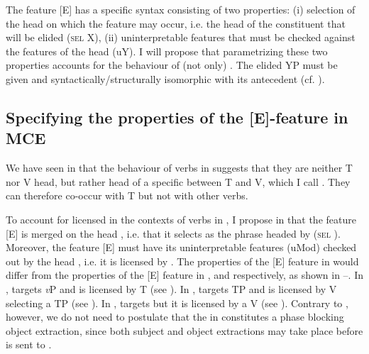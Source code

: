 \documentclass[output=paper,colorlinks,citecolor=brown,]{langsci/langscibook}
\begin{document}
The feature [E] has a specific syntax consisting of two properties:
(i) selection of the head on which the feature may occur, i.e. the head of the constituent that will be elided (\textsc{sel} X), (ii) uninterpretable features that must be checked against the features of the head  (uY). I will propose that parametrizing these two properties accounts for the behaviour of (not only)  . The elided YP must be given \citep{Barbiers1995,Lobeck1995,Merchant2001} and syntactically/structurally isomorphic with its antecedent (cf. \citealt{fiengo1994indices}).

\subsection{Specifying the properties of the [E]-feature in MCE} \label{sec:5.1}

We have seen in  that the behaviour of  verbs in  suggests that they are neither T nor V head, but rather head of a specific  between T and V, which I call . They can therefore co-occur with T but not with other  verbs.

To account for  licensed in the contexts of  verbs in , I propose in  that the feature [E] is merged on the head , i.e. that it selects as  the phrase headed by  (\textsc{sel} ). Moreover, the feature [E] must have its uninterpretable features (uMod) checked out by the head , i.e. it is licensed by . The properties of the [E] feature in  would differ from the properties of the [E] feature in ,  and  respectively, as shown in --. In ,  targets \textit{v}P and is licensed by T (see \citealt{Merchant2008a}). In ,  targets TP and is licensed by  V selecting a TP (see \citealt{Dagnac2008}). In ,  targets  but it is licensed by a  V (see \citealt{Aelbrecht2008}). Contrary to , however, we do not need to postulate that the  in  constitutes a phase blocking object extraction, since both subject and object extractions may take place before  is sent to .
\end{document}
